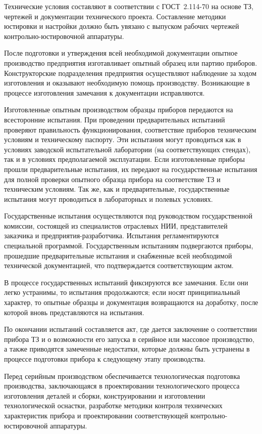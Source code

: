 Технические условия составляют в соответствии с ГОСТ~2.114-70 на основе ТЗ, чертежей и документации технического проекта.
Составление методики юстировки и настройки должно быть увязано с выпуском рабочих чертежей контрольно-юстировочной аппаратуры.

После подготовки и утверждения всей необходимой документации опытное производство предприятия изготавливает опытный образец или партию приборов. Конструкторские подразделения предприятия осуществляют наблюдение за ходом изготовления и оказывают необходимую помощь производству. Возникающие в процессе изготовления замечания к документации исправляются.

Изготовленные опытным производством образцы приборов передаются на всесторонние испытания. При проведении предварительных испытаний проверяют правильность функционирования, соответствие приборов техническим условиям и техническому паспорту. Эти испытания могут проводиться как в условиях заводской испытательной лаборатории (на соответствующих стендах), так и в условиях предполагаемой эксплуатации. Если изготовленные приборы прошли предварительные испытания, их передают на государственные испытания для полной проверки опытного образца прибора на соответствие ТЗ и техническим условиям. Так же, как и предварительные, государственные испытания могут проводиться в лабораторных и полевых условиях.

Государственные испытания осуществляются под руководством государственной комиссии, состоящей из специалистов отраслевых НИИ, представителей заказчика и предприятия-раз\-ра\-бот\-чи\-ка. Испытания регламентируются специальной программой. Государственным испытаниям подвергаются приборы, прошедшие предварительные испытания и снабженные всей необходимой технической документацией, что подтверждается соответствующим актом.

В процессе государственных испытаний фиксируются все замечания. Если они легко устранимы, то испытания продолжаются; если носят принципиальный характер, то опытные образцы и документация возвращаются на доработку, после которой вновь представляются на испытания.

По окончании испытаний составляется акт, где дается заключение о соответствии прибора ТЗ и о возможности его запуска в серийное или массовое производство, а также приводятся замеченные недостатки, которые должны быть устранены в процессе подготовки прибора к следующему этапу производства.

Перед серийным производством обеспечивается технологическая подготовка производства, заключающаяся в проектировании технологического процесса изготовления деталей и сборки, конструировании и изготовлении технологической оснастки, разработке методики контроля технических характеристик прибора и проектировании соответствующей контрольно-юс\-ти\-ро\-воч\-ной аппаратуры.

